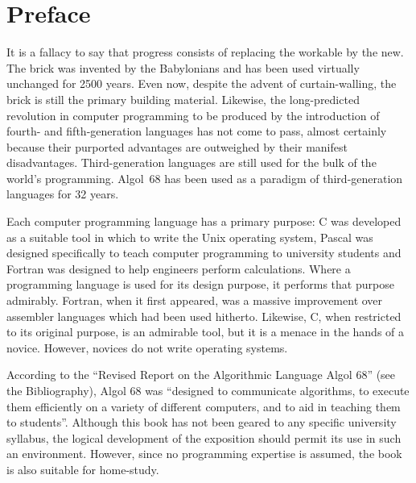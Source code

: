 %
%
%
%
\parindent=5mm
\chapter{Preface}
It is a fallacy to say that progress consists of replacing the workable
by the new.  The brick was invented by the Babylonians and has been
used virtually unchanged for 2500 years.  Even now, despite the advent
of curtain-walling, the brick is still the primary building material.
Likewise, the long-predicted revolution in computer programming to be
produced by the introduction of fourth- and fifth-generation languages
has not come to pass, almost certainly because their purported
advantages are outweighed by their manifest disadvantages. 
Third-generation languages are still used for the bulk of the world's
programming.  Algol~68 has been used as a paradigm of third-generation
languages for 32 years.

Each computer programming language has a primary purpose: C was
developed as a suitable tool in which to write the Unix operating
system, Pascal was designed specifically to teach computer programming
to university students and Fortran was designed to help engineers
perform calculations. Where a programming language is used for its
design purpose, it performs that purpose admirably. Fortran, when it
first appeared, was a massive improvement over assembler languages
which had been used hitherto.  Likewise, C, when restricted to its
original purpose, is an admirable tool, but it is a menace in the hands
of a novice.  However, novices do not write operating systems.

According to the ``Revised Report on the Algorithmic Language Algol
68'' (see the Bibliography), Algol 68 was ``designed to communicate
algorithms, to execute them efficiently on a variety of different
computers, and to aid in teaching them to students''.  Although this
book has not been geared to any specific university syllabus, the
logical development of the exposition should permit its use in such an
environment.  However, since no programming expertise is assumed, the
book is also suitable for home-study.

